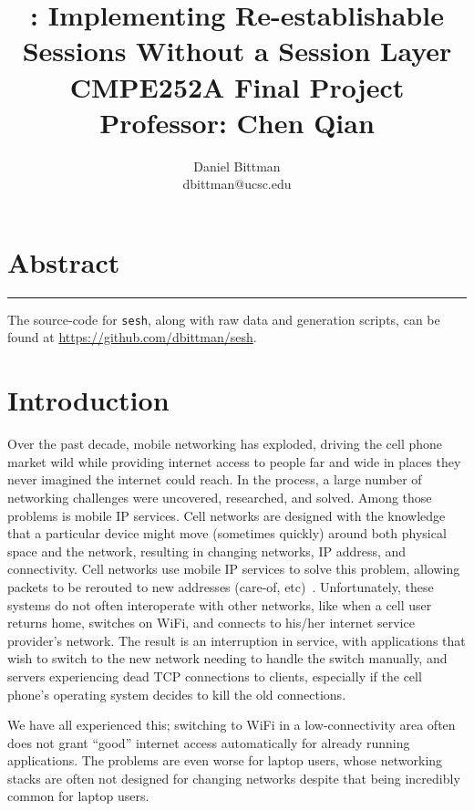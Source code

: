 \documentclass[twocolumn,10pt]{article}
\author{Daniel Bittman \\ dbittman@ucsc.edu}
\title{\sesh: \textbf{Implementing Re-establishable\\Sessions Without a Session Layer}
\\
{\vspace{5mm}\normalsize CMPE252A Final Project\\\vspace{-3mm} Professor: Chen Qian}
}
\newcommand{\sesh}{\texttt{sesh}\xspace}
\begin{document}
\biolinum
\maketitle
\libertine
\renewcommand\ttdefault{lmtt}

\section*{Abstract}


\begin{center}\noindent\rule{2cm}{0.4pt}\end{center}

The source-code for \sesh, along with raw data and generation scripts,
can be found at \url{https://github.com/dbittman/sesh}.

\section{Introduction}

Over the past decade, mobile networking has exploded, driving the cell phone
market wild while providing internet access to people far and wide in places
they never imagined the internet could reach. In the process, a large number of
networking challenges were uncovered, researched, and solved. Among those
problems is mobile IP services. Cell networks are designed with the knowledge
that a particular device might move (sometimes quickly) around both physical
space and the network, resulting in changing networks, IP address, and
connectivity. Cell networks use mobile IP services to solve this problem,
allowing packets to be rerouted to new addresses (care-of,
etc)~\cite{Kurose,mobileip}. Unfortunately, these systems do not often interoperate
with other networks, like when a cell user returns home, switches on WiFi, and
connects to his/her internet service provider's network. The result is an
interruption in service, with applications that wish to switch to the new
network needing to handle the switch manually, and servers experiencing dead TCP
connections to clients, especially if the cell phone's operating system decides
to kill the old connections.

We have all experienced this; switching to WiFi in a low-connectivity area often
does not grant ``good'' internet access automatically for already running
applications. The problems are even worse for laptop users, whose networking
stacks are often not designed for changing networks despite that being
incredibly common for laptop users.
\end{document}
